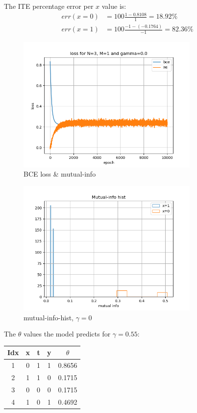 \documentclass[oneside,12pt]{article}
\begin{document}
%
The ITE percentage error per $x$ value is:
%
\begin{equation}
    \begin{split}
        err(x=0) &= 100\frac{1-0.8108}{1} = 18.92 \%\\
        err(x=1) &= 100\frac{-1-(-0.1764)}{-1} = 82.36 \%
    \end{split}
\end{equation}
%
\begin{figure}
    \centering
        \includegraphics[width=0.8\textwidth]{./gamma_0}
        \caption{\label{fig:gamma_0}BCE loss \& mutual-info}
\end{figure}
%
\begin{figure}
    \centering
        \includegraphics[width=0.8\textwidth]{./mutualInfoHist_gamma_0}
        \caption{\label{fig:mutualInfoHist_gamma_0}mutual-info-hist, $\gamma=0$}
\end{figure}
%
The $\theta$ values the model predicts for $\gamma=0.55$:
%
\begin{center}
 \begin{tabular}{||c | c | c | c | c ||}
 \hline
 Idx & x & t & y & $\theta$ \\ [0.5ex] 
 \hline\hline
 1 & 0 & 1 & 1 & 0.8656 \\ 
 \hline
 2 & 1 & 1 & 0 & 0.1715 \\
 \hline
 3 & 0 & 0 & 0 & 0.1715 \\
 \hline
 4 & 1 & 0 & 1 & 0.4692 \\ [1ex] 
 \hline
\end{tabular}
\end{center}
\end{document}
